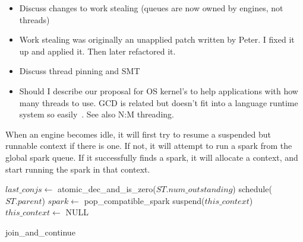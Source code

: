 

\begin{itemize}

    \item Discuss changes to work stealing (queues are now owned by engines,
          not threads)

    \item Work stealing was originally an unapplied patch written by Peter.
          I fixed it up and applied it.  Then later refactored it.

    \item Discuss thread pinning and SMT

    \item Should I describe our proposal for OS kernel's to help
          applications with how many threads to use.
          GCD is related but doesn't fit into a language runtime system so
          easily~\cite{apple_gcd}.
          See also N:M threading.

\end{itemize}

When an engine becomes idle, it will first try
to resume a suspended but runnable context if there is one.
If not, it will attempt to run a spark from the global spark queue.
If it successfully finds a spark, it will allocate a context,
and start running the spark in that context.


\begin{algorithm}
\begin{algorithmic}
  \State $last\_conjs \gets$ atomic\_dec\_and\_is\_zero($ST.num\_outstanding$)
    \Else
      \State schedule($ST.parent$)
    \EndIf
  \Else
    \State $spark \gets$ pop\_compatible\_spark
    \Else
         \State suspend($this\_context$)
         \State $this\_context \gets$ NULL
      \EndIf
    \EndIf
  \EndIf
\EndProcedure
\end{algorithmic}
\caption{join\_and\_continue}
\label{alg:join_and_continue}
\end{algorithm}

